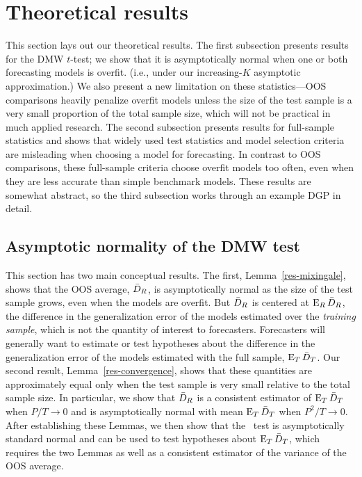 \documentclass[12pt]{article}
\begin{document}
\section{Theoretical results}
\label{sec:theory}

This section lays out our theoretical results. The first subsection
presents results for the DMW $t$-test; we show that it is
asymptotically normal when one or both forecasting models is overfit.
(i.e., under our increasing-$K$ asymptotic approximation.) We also
present a new limitation on these statistics---OOS comparisons heavily
penalize overfit models unless the size of the test sample is a very
small proportion of the total sample size, which will not be practical
in much applied research. The second subsection presents results for
full-sample statistics and shows that widely used test statistics and
model selection criteria are misleading when choosing a model for
forecasting. In contrast to OOS comparisons, these full-sample
criteria choose overfit models too often, even when they are less
accurate than simple benchmark models. These results are somewhat
abstract, so the third subsection works through an example DGP in
detail.

\subsection{Asymptotic normality of the DMW test}
\label{sec:oostheory}

This section has two main conceptual results. The first,
Lemma~\ref{res-mixingale}, shows that the OOS average, $\bar{D}_{R}$, is
asymptotically normal as the size of the test sample grows, even when
the models are overfit. But $\bar{D}_{R}$ is centered at $\operatorname{E}_R \bar{D}_{R}$, the
difference in the generalization error of the models estimated over
the \emph{training sample}, which is not the quantity of interest to
forecasters. Forecasters will generally want to estimate or test
hypotheses about the difference in the generalization error of the
models estimated with the full sample, $\operatorname{E}_T \bar{D}_{T}$. Our second
result, Lemma~\ref{res-convergence}, shows that these quantities are
approximately equal only when the test sample is very small relative
to the total sample size. In particular, we show that $\bar{D}_{R}$ is a
consistent estimator of $\operatorname{E}_T \bar{D}_{T}$ when $P/T \to 0$ and is
asymptotically normal with mean $\operatorname{E}_T \bar{D}_{T}$ when $P^2/T \to 0$. After
establishing these Lemmas, we then show that the \oost\ test is
asymptotically standard normal and can be used to test hypotheses
about $\operatorname{E}_T \bar{D}_{T}$, which requires the two Lemmas as well as a
consistent estimator of the variance of the OOS average.
\end{document}
